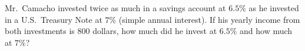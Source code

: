 Mr.\ Camacho invested twice as much in a savings account at $6.5\%$ as he invested in a U.S.\ Treasury Note at $7\%$ (simple annual interest). If his yearly income from both investments is $800$ dollars, how much did he invest at $6.5\%$ and how much at $7\%$?
